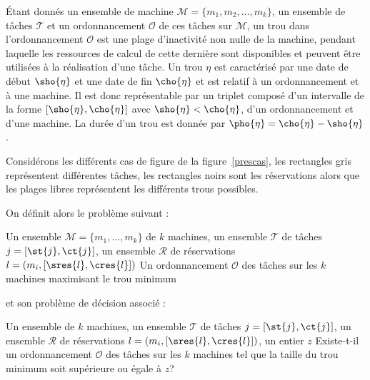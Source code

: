 \documentclass[a4paper,11pt]{thesis}
\begin{document}
\begin{ndf}[Trou]
    Étant donnés un ensemble de machine $\mathcal{M} = \{m_1, m_2, \dots, m_k\}$, un ensemble de
    tâches $\mathcal{T}$ et un ordonnancement $\mathcal{O}$ de ces tâches sur $\mathcal{M}$, un trou
    dans l'ordonnancement $\mathcal{O}$ est une plage d'inactivité non nulle de la machine, pendant
    laquelle les ressources de calcul de cette dernière sont disponibles et peuvent être utilisées à
    la réalisation d'une tâche. Un trou $\eta$ est caractérisé par une date de début $\sho{\eta}$ et
    une date de fin $\cho{\eta}$ et est relatif à un ordonnancement et à une machine. Il est donc
    représentable par un triplet composé d'un intervalle de la forme $[\sho{\eta}, \cho{\eta}]$ avec
    $\sho{\eta} < \cho{\eta}$, d'un ordonnancement et d'une machine. La durée d'un trou est donnée
    par $\pho{\eta} = \cho{\eta} - \sho{\eta}$.
\end{ndf}

\begin{nrmq}
    Considérons les différents cas de figure de la figure~\ref{prescas}, les rectangles gris
    représentent différentes tâches, les rectangles noirs sont les réservations alors que les plages
    libres représentent les différents trous possibles.
\end{nrmq}

On définit alors le problème suivant :

\dfopt{\fisched}
{Un ensemble $\mathcal{M} = \{m_1, \dots, m_k\}$ de $k$ machines, un ensemble $\mathcal{T}$ de
tâches $j = [\st{j}, \ct{j}]$, un ensemble $\mathcal{R}$ de réservations $l = (m_i, [\sres{l},
\cres{l}])$} 
{Un ordonnancement $\mathcal{O}$ des tâches sur les $k$ machines maximisant le trou
minimum}

et son problème de décision associé :

\dfdec{\fischedpi}
{Un ensemble de $k$ machines, un ensemble $\mathcal{T}$ de tâches $j = [\st{j}, \ct{j}]$, un
ensemble $\mathcal{R}$ de réservations $l = (m_i, [\sres{l}, \cres{l}])$, un entier $z$}
{Existe-t-il un ordonnancement $\mathcal{O}$ des tâches sur les $k$ machines tel que la taille du
trou minimum soit supérieure ou égale à $z$?}
\end{document}
